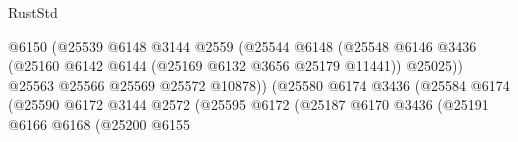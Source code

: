 \begin{lexlean}{RustStd}
\begin{coremodule}
                                                        @6150
                                                        (@25539
                                                          @6148
                                                          @3144
                                                          @2559
                                                          (@25544
                                                            @6148
                                                            (@25548
                                                              @6146
                                                              @3436
                                                              (@25160
                                                                @6142
                                                                @6144
                                                                (@25169 @6132 @3656 @25179 @11441))
                                                              @25025))
                                                          @25563
                                                          @25566
                                                          @25569
                                                          @25572
                                                          @10878))
                                                      (@25580
                                                        @6174
                                                        @3436
                                                        (@25584
                                                          @6174
                                                          (@25590
                                                            @6172
                                                            @3144
                                                            @2572
                                                            (@25595
                                                              @6172
                                                              (@25187
                                                                @6170
                                                                @3436
                                                                (@25191
                                                                  @6166
                                                                  @6168
                                                                  (@25200
                                                                    @6155

\end{coremodule}
\end{lexlean}
